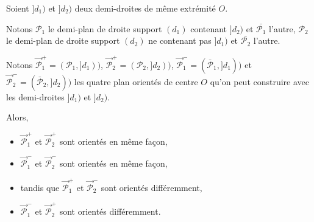 \begin{prop}\label{prop-pairsplanoriente}
    Soient $]d_1)$ et $]d_2)$ deux demi-droites de même extrémité $O$. 
    
    Notons $\mathcal{P}_1$ le demi-plan de droite support $(d_1)$ contenant $]d_2)$ et $\bar{\mathcal{P}_1}$ l'autre, $\mathcal{P}_2$ le demi-plan de droite support $(d_2)$ ne contenant pas $]d_1)$ et $\bar{\mathcal{P}_2}$ l'autre.

    Notons $\overrightarrow{\mathcal{P}}_1^+ = (\mathcal{P}_1,]d_1))$, $\overrightarrow{\mathcal{P}}_2^+ = (\mathcal{P}_2,]d_2))$, $\overrightarrow{\mathcal{P}}_1^- = (\bar{\mathcal{P}}_1,]d_1))$ et $\overrightarrow{\mathcal{P}}_2^- = (\bar{\mathcal{P}}_2,]d_2))$ les quatre plan orientés de centre $O$ qu'on peut construire avec les demi-droites $]d_1)$ et $]d_2)$. 

    Alors,
    \begin{itemize}[$\bullet$]
        \item $\overrightarrow{\mathcal{P}}_1^+$ et $\overrightarrow{\mathcal{P}}_2^+$ sont orientés en même façon,
        \item $\overrightarrow{\mathcal{P}}_1^-$ et $\overrightarrow{\mathcal{P}}_2^-$ sont orientés en même façon,
        \item tandis que $\overrightarrow{\mathcal{P}}_1^+$ et $\overrightarrow{\mathcal{P}}_2^-$ sont orientés différemment,
        \item $\overrightarrow{\mathcal{P}}_1^-$ et $\overrightarrow{\mathcal{P}}_2^+$ sont orientés différemment.
    \end{itemize}
\end{prop}

